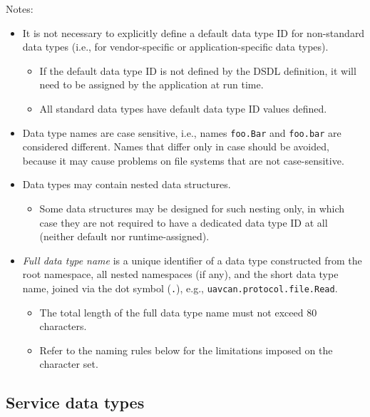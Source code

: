 Notes:

\begin{itemize}
    \item It is not necessary to explicitly define a default data type ID for non-standard data types
          (i.e., for vendor-specific or application-specific data types).
    \begin{itemize}
        \item If the default data type ID is not defined by the DSDL definition,
              it will need to be assigned by the application at run time.
        \item All standard data types have default data type ID values defined.
    \end{itemize}

    \item Data type names are case sensitive, i.e., names \verb|foo.Bar| and \verb|foo.bar| are considered different.
          Names that differ only in case should be avoided, because it may cause problems on file systems that are not
          case-sensitive.

    \item Data types may contain nested data structures.
    \begin{itemize}
        \item Some data structures may be designed for such nesting only,
              in which case they are not required to have a dedicated data type ID at all
              (neither default nor runtime-assigned).
    \end{itemize}

    \item \emph{Full data type name} is a unique identifier of a data type constructed from the root namespace,
          all nested namespaces (if any), and the short data type name, joined via the dot symbol (\verb|.|),
          e.g., \verb|uavcan.protocol.file.Read|.
    \begin{itemize}
        \item The total length of the full data type name must not exceed 80 characters.
        \item Refer to the naming rules below for the limitations imposed on the character set.
    \end{itemize}
\end{itemize}

\subsection{Service data types}

